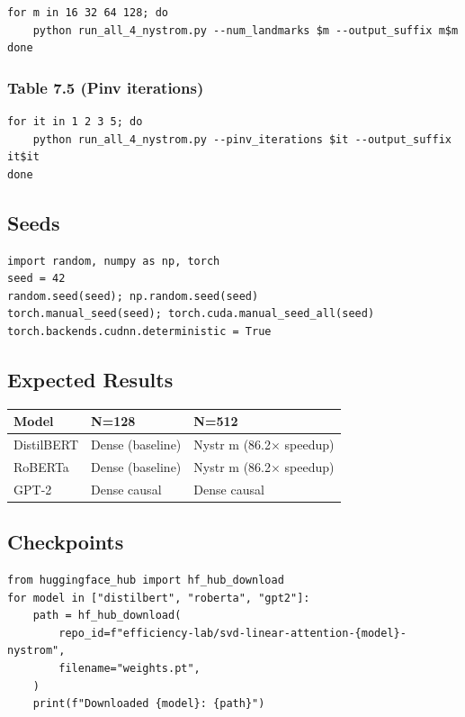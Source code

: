 \begin{lstlisting}
for m in 16 32 64 128; do
    python run_all_4_nystrom.py --num_landmarks $m --output_suffix m$m
done
\end{lstlisting}

\subsubsection{Table 7.5 (Pinv iterations)}

\begin{lstlisting}
for it in 1 2 3 5; do
    python run_all_4_nystrom.py --pinv_iterations $it --output_suffix it$it
done
\end{lstlisting}

\subsection{Seeds}

\begin{lstlisting}
import random, numpy as np, torch
seed = 42
random.seed(seed); np.random.seed(seed)
torch.manual_seed(seed); torch.cuda.manual_seed_all(seed)
torch.backends.cudnn.deterministic = True
\end{lstlisting}

\subsection{Expected Results}

\begin{table}[H]
\centering
\small
\begin{tabular}{lll}
\toprule
\textbf{Model} & \textbf{N=128} & \textbf{N=512} \\
\midrule
DistilBERT & Dense (baseline) & Nystr m (86.2$\times$ speedup) \\
RoBERTa & Dense (baseline) & Nystr m (86.2$\times$ speedup) \\
GPT-2 & Dense causal & Dense causal \\
\bottomrule
\end{tabular}
\end{table}

\subsection{Checkpoints}

\begin{lstlisting}
from huggingface_hub import hf_hub_download
for model in ["distilbert", "roberta", "gpt2"]:
    path = hf_hub_download(
        repo_id=f"efficiency-lab/svd-linear-attention-{model}-nystrom",
        filename="weights.pt",
    )
    print(f"Downloaded {model}: {path}")
\end{lstlisting}

